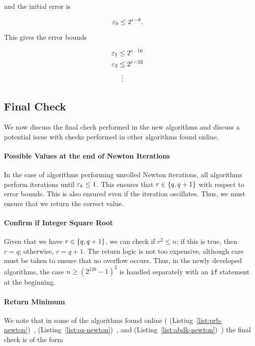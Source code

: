 \noindent
and the initial error is

\begin{equation}
    \varepsilon_{0} \le 2^{e-8}.
\end{equation}

\noindent
This gives the error bounds

\begin{align}
    \varepsilon_{1} &\le 2^{e-16} \nonumber\\
    \varepsilon_{2} &\le 2^{e-32} \nonumber\\
        &\ \vdots
\end{align}


\subsection{Final Check}
\label{app:final_check}

We now discuss the final check performed in the new algorithms
and discuss a potential issue with checks performed
in other algorithms found online.

\paragraph{Possible Values at the end of Newton Iterations}
In the case of algorithms performing unrolled Newton iterations,
all algorithms perform iterations until $\varepsilon_{k}\le 1$.
This ensures that $r\in\left\{ q,q+1 \right\}$ with respect
to error bounds.
This is also ensured even if the iteration oscillates.
Thus, we must ensure that we return the correct value.

\paragraph{Confirm if Integer Square Root}
Given that we have $r\in\left\{ q,q+1 \right\}$,
we can check if $r^{2}\le n$:
if this is true, then $r=q$; otherwise, $r=q+1$.
The return logic is not too expensive,
although care must be taken to ensure that no overflow occurs.
Thus, in the newly developed algorithms,
the case $n\ge(2^{128}-1)^{2}$ is handled separately with an \texttt{if}
statement at the beginning.

\paragraph{Return Minimum}
We note that in some of the algorithms found online
(\prb{} (Listing~\ref{list:prb-newton})~\cite{prb-math},
\OpenZeppelin{} (Listing~\ref{list:oz-newton})~\cite{open-zeppelin}, and
\abdk{} (Listing~\ref{list:abdk-newton})~\cite{abdk-consulting})
the final check is of the form

